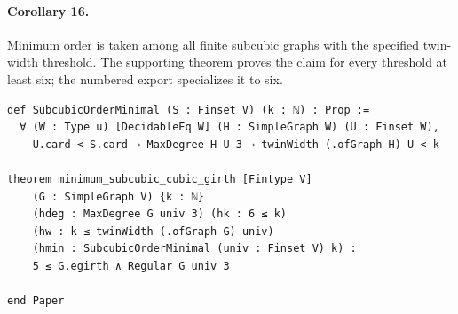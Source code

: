 \par\medskip
\noindent\begin{minipage}{\linewidth}
\paragraph*{Corollary 16.}
Minimum order is taken among all finite subcubic graphs with the specified
twin-width threshold. The supporting theorem proves the claim for every
threshold at least six; the numbered export specializes it to six.
\begin{lstlisting}
def SubcubicOrderMinimal (S : Finset V) (k : ℕ) : Prop :=
  ∀ (W : Type u) [DecidableEq W] (H : SimpleGraph W) (U : Finset W),
    U.card < S.card → MaxDegree H U 3 → twinWidth (.ofGraph H) U < k

theorem minimum_subcubic_cubic_girth [Fintype V]
    (G : SimpleGraph V) {k : ℕ}
    (hdeg : MaxDegree G univ 3) (hk : 6 ≤ k)
    (hw : k ≤ twinWidth (.ofGraph G) univ)
    (hmin : SubcubicOrderMinimal (univ : Finset V) k) :
    5 ≤ G.egirth ∧ Regular G univ 3

end Paper
\end{lstlisting}
\end{minipage}
\par
\endgroup
